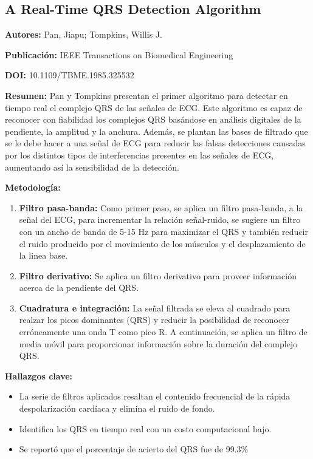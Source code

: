 \documentclass[12pt,letterpaper,oneside,openright]{book}
\begin{document}
\subsection{A Real-Time QRS Detection Algorithm \cite{PanTompkins85}}
\textbf{Autores:} Pan, Jiapu; Tompkins, Willis J. 

\textbf{Publicación:} IEEE Transactions on Biomedical Engineering

\textbf{DOI:} 10.1109/TBME.1985.325532

\textbf{Resumen:} Pan y Tompkins presentan el primer algoritmo para detectar en tiempo real el complejo QRS de las señales de ECG. Este algoritmo es capaz de reconocer con fiabilidad los complejos QRS basándose en análisis digitales de la pendiente, la amplitud y la anchura. Además, se plantan las bases de filtrado que se le debe hacer a una señal de ECG para reducir las falsas detecciones causadas por los distintos tipos de interferencias presentes en las señales de ECG, aumentando así la sensibilidad de la detección.

\textbf{Metodología:} 
\begin{enumerate}
	\item \textbf{Filtro pasa-banda:} Como primer paso, se aplica un filtro pasa-banda, a la señal del ECG, para incrementar la relación señal-ruido, se sugiere un filtro con un ancho de banda de 5-15 Hz para maximizar el QRS y también reducir el ruido producido por el movimiento de los músculos y el desplazamiento de la linea base.
	\item \textbf{Filtro derivativo:} Se aplica un filtro derivativo para proveer información acerca de la pendiente del QRS.
	\item \textbf{Cuadratura e integración:} La señal filtrada se eleva al cuadrado para realzar los picos dominantes (QRS) y reducir la posibilidad de reconocer erróneamente una onda T como pico R. A continuación, se aplica un filtro de media móvil para proporcionar información sobre la duración del complejo QRS.
\end{enumerate}
	
\textbf{Hallazgos clave:}
\begin{itemize}
	\item La serie de filtros aplicados resaltan el contenido frecuencial de la rápida despolarización cardíaca y elimina el ruido de fondo.
	\item Identifica los QRS en tiempo real con un costo computacional bajo.
	\item Se reportó que el porcentaje de acierto del QRS fue de 99.3\%
\end{itemize}
\end{document}
